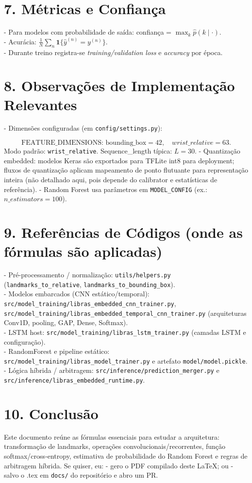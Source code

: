 \documentclass[12pt]{article}
\begin{document}
\section*{7. Métricas e Confiança}
- Para modelos com probabilidade de saída: confiança = $\max_k \hat p(k\mid \cdot)$.\\
- Acurácia: $\frac{1}{N}\sum_{n}\mathbf{1}\{\hat y^{(n)}=y^{(n)}\}$.\\
- Durante treino registra-se \emph{training/validation loss} e \emph{accuracy} por época.

\section*{8. Observações de Implementação Relevantes}
 - Dimensões configuradas (em \texttt{config/settings.py}):
  
  \[
  \text{FEATURE\_DIMENSIONS: bounding\_box}=42,\quad wrist\_relative=63.
  \]
  Modo padrão: \texttt{wrist\_relative}. Sequence\_length típica: $L=30$.
- Quantização embedded: modelos Keras são exportados para TFLite int8 para deployment; fluxos de quantização aplicam mapeamento de ponto flutuante para representação inteira (não detalhado aqui, pois depende do calibrator e estatísticas de referência).
 - Random Forest usa parâmetros em \texttt{MODEL\_CONFIG} (ex.: $n\_estimators=100$).

\section*{9. Referências de Códigos (onde as fórmulas são aplicadas)}
 - Pré-processamento / normalização: \texttt{utils/helpers.py} (\texttt{landmarks\_to\_relative}, \texttt{landmarks\_to\_bounding\_box}).\\
 - Modelos embarcados (CNN estático/temporal): \texttt{src/model\_training/libras\_embedded\_cnn\_trainer.py}, \texttt{src/model\_training/libras\_embedded\_temporal\_cnn\_trainer.py} (arquiteturas Conv1D, pooling, GAP, Dense, Softmax).\\
 - LSTM host: \texttt{src/model\_training/libras\_lstm\_trainer.py} (camadas LSTM e configuração).\\
 - RandomForest e pipeline estático: \texttt{src/model\_training/libras\_model\_trainer.py} e artefato \texttt{model/model.pickle}.\\
 - Lógica híbrida / arbitragem: \texttt{src/inference/prediction\_merger.py} e \texttt{src/inference/libras\_embedded\_runtime.py}.

\section*{10. Conclusão}
Este documento reúne as fórmulas essenciais para estudar a arquitetura: transformação de landmarks, operações convolucionais/recorrentes, função softmax/cross‑entropy, estimativa de probabilidade do Random Forest e regras de arbitragem híbrida. Se quiser, eu:
- gero o PDF compilado deste \LaTeX{}; ou
- salvo o .tex em \texttt{docs/} do repositório e abro um PR.
\end{document}
